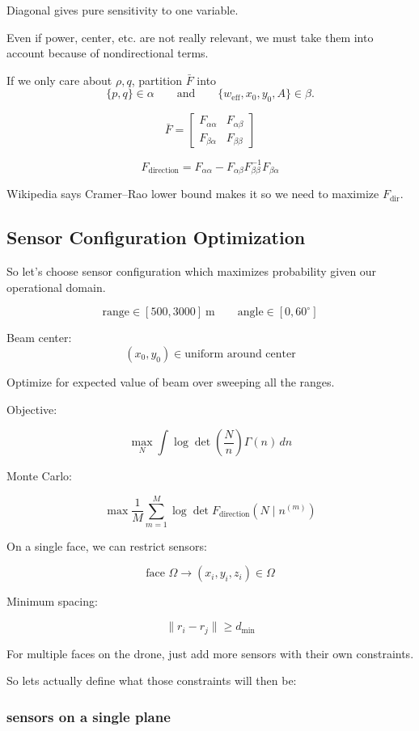 \documentclass[12pt]{article}
\begin{document}
Diagonal gives pure sensitivity to one variable.

Even if power, center, etc. are not really relevant, we must take them into account because of nondirectional terms.

If we only care about \(\rho,q\), partition \(\bar{F}\) into
\[
\{p,q\}\in \alpha
\qquad \text{and} \qquad
\{w_{\text{eff}},x_0,y_0,A\}\in \beta .
\]

\[
\bar{F}
=
\begin{bmatrix}
F_{\alpha\alpha} & F_{\alpha\beta} \\
F_{\beta\alpha} & F_{\beta\beta}
\end{bmatrix}
\]

\[
F_{\text{direction}}
=
F_{\alpha\alpha}
-
F_{\alpha\beta}F_{\beta\beta}^{-1}F_{\beta\alpha}
\]

Wikipedia says Cramer--Rao lower bound makes it so we need to maximize \(F_{\text{dir}}\).

\subsection{Sensor Configuration Optimization}

So let's choose sensor configuration which maximizes probability given our operational domain.

\[
\text{range}\in [500,3000]~\mathrm{m}
\qquad
\text{angle}\in [0,60^\circ]
\]

Beam center:
\[
(x_0,y_0)\in \text{uniform around center}
\]

Optimize for expected value of beam over sweeping all the ranges.

Objective:

\[
\max_N \int \log \det \left(\frac{N}{n}\right)\Gamma(n)\,dn
\]

Monte Carlo:

\[
\max \frac{1}{M}\sum_{m=1}^{M}
\log \det F_{\text{direction}}\left(N \mid n^{(m)}\right)
\]

On a single face, we can restrict sensors:

\[
\text{face } \Omega \rightarrow (x_i,y_i,z_i) \in \Omega
\]

Minimum spacing:

\[
\|r_i-r_j\| \geq d_{\min}
\]

For multiple faces on the drone, just add more sensors with their own constraints.


So lets actually define what those constraints will then be:

\subsubsection{sensors on a single plane}
\end{document}
